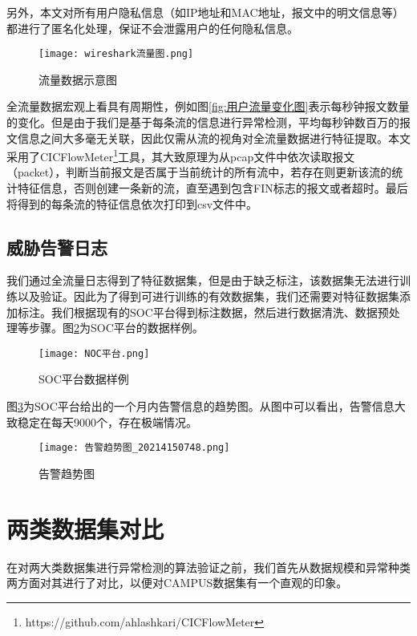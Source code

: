 另外，本文对所有用户隐私信息（如IP地址和MAC地址，报文中的明文信息等）都进行了匿名化处理，保证不会泄露用户的任何隐私信息。

\begin{figure}
    \centering
    \texttt{[image: wireshark流量图.png]}
    \caption{流量数据示意图}
    \label{fig:wireshark}
  \end{figure}

全流量数据宏观上看具有周期性，例如图\ref{fig:用户流量变化图}表示每秒钟报文数量的变化。但是由于我们是基于每条流的信息进行异常检测，平均每秒钟数百万的报文信息之间大多毫无关联，因此仅需从流的视角对全流量数据进行特征提取。本文采用了CICFlowMeter\footnote{https://github.com/ahlashkari/CICFlowMeter}工具，其大致原理为从pcap文件中依次读取报文（packet），判断当前报文是否属于当前统计的所有流中，若存在则更新该流的统计特征信息，否则创建一条新的流，直至遇到包含FIN标志的报文或者超时。最后将得到的每条流的特征信息依次打印到csv文件中。


\subsection{威胁告警日志}
我们通过全流量日志得到了特征数据集，但是由于缺乏标注，该数据集无法进行训练以及验证。因此为了得到可进行训练的有效数据集，我们还需要对特征数据集添加标注。我们根据现有的SOC平台得到标注数据，然后进行数据清洗、数据预处理等步骤。图\ref{fig:NOC平台数据样例}为SOC平台的数据样例。
\begin{figure}
    \centering
    \texttt{[image: NOC平台.png]}
    \caption{SOC平台数据样例}
    \label{fig:NOC平台数据样例}
  \end{figure}


图\ref{fig:告警趋势图}为SOC平台给出的一个月内告警信息的趋势图。从图中可以看出，告警信息大致稳定在每天9000个，存在极端情况。
\begin{figure}
    \centering
    \texttt{[image: 告警趋势图\_20214150748.png]}
    \caption{告警趋势图}
    \label{fig:告警趋势图}
  \end{figure}
\section{两类数据集对比}
在对两大类数据集进行异常检测的算法验证之前，我们首先从数据规模和异常种类两方面对其进行了对比，以便对CAMPUS数据集有一个直观的印象。


